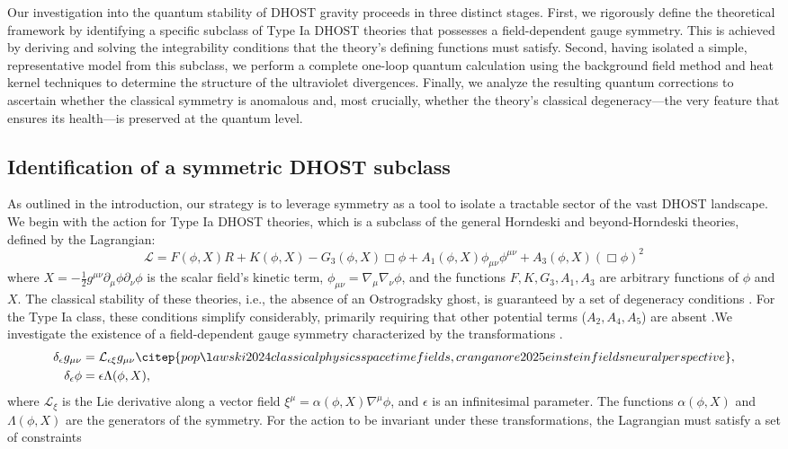 \documentclass[twocolumn]{aastex631}
\begin{document}
Our investigation into the quantum stability of DHOST gravity proceeds in three distinct stages. First, we rigorously define the theoretical framework by identifying a specific subclass of Type Ia DHOST theories that possesses a field-dependent gauge symmetry. This is achieved by deriving and solving the integrability conditions that the theory's defining functions must satisfy. Second, having isolated a simple, representative model from this subclass, we perform a complete one-loop quantum calculation using the background field method and heat kernel techniques to determine the structure of the ultraviolet divergences. Finally, we analyze the resulting quantum corrections to ascertain whether the classical symmetry is anomalous and, most crucially, whether the theory's classical degeneracy---the very feature that ensures its health---is preserved at the quantum level.\subsection{Identification of a symmetric DHOST subclass}As outlined in the introduction, our strategy is to leverage symmetry as a tool to isolate a tractable sector of the vast DHOST landscape. We begin with the action for Type Ia DHOST theories, which is a subclass of the general Horndeski and beyond-Horndeski theories, defined by the Lagrangian:\begin{equation}\mathcal{L} = F(\phi, X) R + K(\phi, X) - G_3(\phi, X) \Box\phi + A_1(\phi, X) \phi_{\mu\nu}\phi^{\mu\nu} + A_3(\phi, X) (\Box\phi)^2\end{equation}where $X = - \frac{1}{2} g^{\mu\nu} \partial_\mu \phi \partial_\nu \phi$ is the scalar field's kinetic term, $\phi_{\mu\nu} = \nabla_\mu \nabla_\nu \phi$, and the functions $F, K, G_3, A_1, A_3$ are arbitrary functions of $\phi$ and $X$. The classical stability of these theories, i.e., the absence of an Ostrogradsky ghost, is guaranteed by a set of degeneracy conditions \citep{crisostomi2017higherderivativefieldtheories,crisostomi2017higherderivativefieldtheories}. For the Type Ia class, these conditions simplify considerably, primarily requiring that other potential terms ($A_2, A_4, A_5$) are absent \citep{nezhad2025degeneratehigherorderscalartensortheories}.We investigate the existence of a field-dependent gauge symmetry characterized by the transformations \citep{banerjee2000quantumgaugesymmetryfinite,upadhyay2012fielddependentnilpotentsymmetry,upadhyay2013finitefielddependentsymmetriesperturbative}.\begin{align}\delta_\epsilon g_{\mu\nu} &= \mathcal{L}_{\epsilon \xi} g_{\mu\nu} \citep{popławski2024classicalphysicsspacetimefields,cranganore2025einsteinfieldsneuralperspective}, \\\delta_\epsilon \phi &= \epsilon \Lambda(\phi, X),\end{align}where $\mathcal{L}_{\xi}$ is the Lie derivative along a vector field $\xi^\mu = \alpha(\phi, X) \nabla^\mu \phi$, and $\epsilon$ is an infinitesimal parameter. The functions $\alpha(\phi, X)$ and $\Lambda(\phi, X)$ are the generators of the symmetry. For the action to be invariant under these transformations, the Lagrangian must satisfy a set of constraints 
\end{document}
